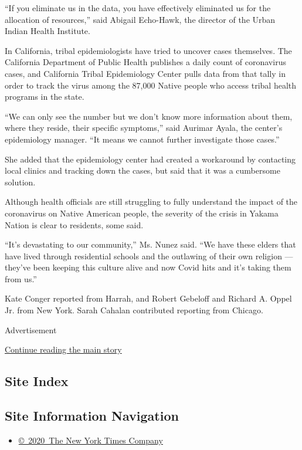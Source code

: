 ``If you eliminate us in the data, you have effectively eliminated us
for the allocation of resources,'' said Abigail Echo-Hawk, the director
of the Urban Indian Health Institute.

In California, tribal epidemiologists have tried to uncover cases
themselves. The California Department of Public Health publishes a daily
count of coronavirus cases, and California Tribal Epidemiology Center
pulls data from that tally in order to track the virus among the 87,000
Native people who access tribal health programs in the state.

``We can only see the number but we don't know more information about
them, where they reside, their specific symptoms,'' said Aurimar Ayala,
the center's epidemiology manager. ``It means we cannot further
investigate those cases.''

She added that the epidemiology center had created a workaround by
contacting local clinics and tracking down the cases, but said that it
was a cumbersome solution.

Although health officials are still struggling to fully understand the
impact of the coronavirus on Native American people, the severity of the
crisis in Yakama Nation is clear to residents, some said.

``It's devastating to our community,'' Ms. Nunez said. ``We have these
elders that have lived through residential schools and the outlawing of
their own religion --- they've been keeping this culture alive and now
Covid hits and it's taking them from us.''

Kate Conger reported from Harrah, and Robert Gebeloff and Richard A.
Oppel Jr. from New York. Sarah Cahalan contributed reporting from
Chicago.

Advertisement

\protect\hyperlink{after-bottom}{Continue reading the main story}

\hypertarget{site-index}{%
\subsection{Site Index}\label{site-index}}

\hypertarget{site-information-navigation}{%
\subsection{Site Information
Navigation}\label{site-information-navigation}}

\begin{itemize}
\tightlist
\item
  \href{https://help.nytimes.com/hc/en-us/articles/115014792127-Copyright-notice}{©~2020~The
  New York Times Company}
\end{itemize}

